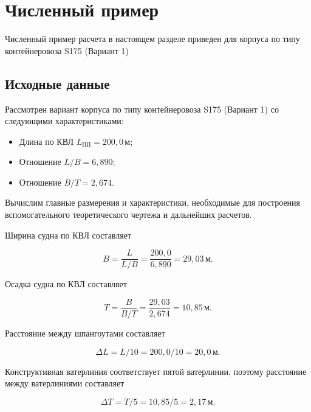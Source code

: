 \appendix
\cyrchapappendix

\chapter{Численный пример}

Численный пример расчета в настоящем разделе приведен для корпуса по типу контейнеровоза S175 (Вариант 1)

\section{Исходные данные}

Рассмотрен вариант корпуса по типу контейнеровоза S175 (Вариант 1) со следующими характеристиками:

\begin{itemize}
    \item Длина по КВЛ $L_{\text{ПП}} = 200{,}0\,\text{м}$;
    \item Отношение $L/B = 6{,}890$;
    \item Отношение $B/T = 2{,}674$.   
\end{itemize}

Вычислим главные размерения и характеристики, необходимые для построения вспомогательного теоретического чертежа и дальнейших расчетов.


Ширина судна по КВЛ составляет

\begin{equation*}
    B = \frac{L}{L/B} = \frac{200{,}0}{6{,}890} = 29{,}03\,\text{м}.
\end{equation*}

Осадка судна по КВЛ составляет

\begin{equation*}
    T = \frac{B}{B/T} = \frac{29{,}03}{2{,}674} = 10{,}85\,\text{м}.
\end{equation*}

Расстояние между шпангоутами составляет

\begin{equation*}
    \Delta L = L / 10 = 200{,}0 / 10 = 20{,}0\,\text{м}.
\end{equation*}

Конструктивная ватерлиния соответствует пятой ватерлинии, поэтому расстояние между ватерлиниями составляет

\begin{equation*}
    \Delta T = T / 5 = 10{,}85 / 5 = 2{,}17\,\text{м}.
\end{equation*}


